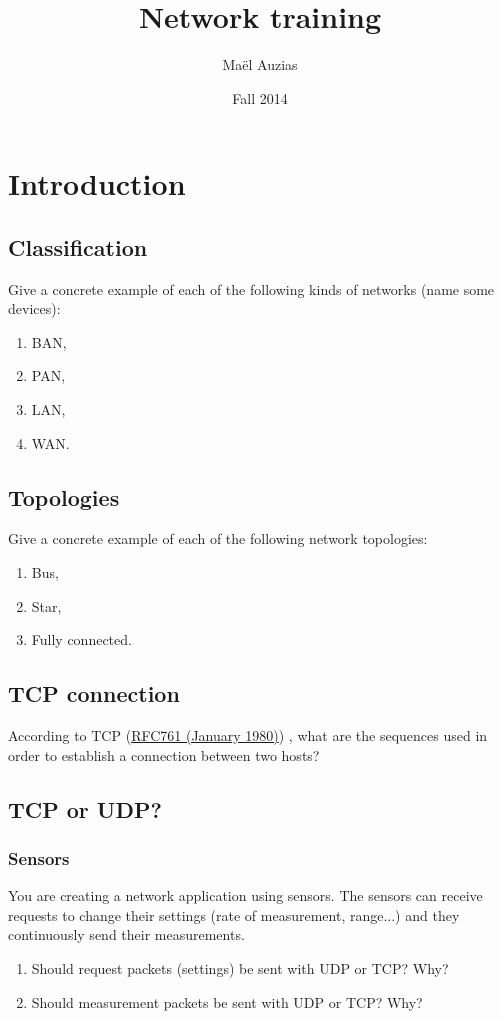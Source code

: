\documentclass[11pt]{article}
\begin{document}
\title{Network training}
\date{Fall 2014}
\author{Maël Auzias}
\maketitle



\section{Introduction}
\subsection{Classification}
Give a concrete example of each of the following kinds of networks (name some devices):
  \begin{enumerate}
    \item BAN,
    \item PAN,
    \item LAN,
    \item WAN.
  \end{enumerate}

\subsection{Topologies}
Give a concrete example of each of the following network topologies:
  \begin{enumerate}
    \item Bus,
    \item Star,
    \item Fully connected.
  \end{enumerate}

\subsection{TCP connection}
According to TCP (\color{blue}\href{http://tools.ietf.org/html/rfc761}{RFC761 (January 1980)}) \color{black}, what are the sequences used in order to establish a connection between two hosts?

\subsection{TCP or UDP?}
\subsubsection{Sensors}
You are creating a network application using sensors. The sensors can receive requests to change their settings (rate of measurement, range...) and they continuously send their measurements.
  \begin{enumerate}
    \item Should request packets (settings) be sent with UDP or TCP? Why?
    \item Should measurement packets be sent with UDP or TCP? Why?
  \end{enumerate}
\end{document}
